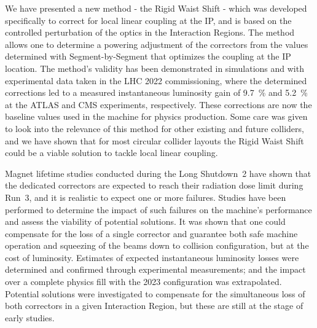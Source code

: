 We have presented a new method - the Rigid Waist Shift - which was developed specifically to correct for local linear coupling at the IP, and is based on the controlled perturbation of the optics in the Interaction Regions.
The method allows one to determine a powering adjustment of the correctors from the values determined with Segment-by-Segment that optimizes the coupling at the IP location.
The method's validity has been demonstrated in simulations and with experimental data taken in the LHC \num{2022} commissioning, where the determined corrections led to a measured instantaneous luminosity gain of \qty{9.7}{\percent} and \qty{5.2}{\percent} at the ATLAS and CMS experiments, respectively.
These corrections are now the baseline values used in the machine for physics production.
Some care was given to look into the relevance of this method for other existing and future colliders, and we have shown that for most circular collider layouts the Rigid Waist Shift could be a viable solution to tackle local linear coupling.
\newline

Magnet lifetime studies conducted during the Long Shutdown~\num{2} have shown that the dedicated correctors are expected to reach their radiation dose limit during Run~\num{3}, and it is realistic to expect one or more failures.
Studies have been performed to determine the impact of such failures on the machine's performance and assess the viability of potential solutions.
It was shown that one could compensate for the loss of a single corrector and guarantee both safe machine operation and squeezing of the beams down to collision configuration, but at the cost of luminosity.
Estimates of expected instantaneous luminosity losses were determined and confirmed through experimental measurements; and the impact over a complete physics fill with the \num{2023} configuration was extrapolated.
Potential solutions were investigated to compensate for the simultaneous loss of both correctors in a given Interaction Region, but these are still at the stage of early studies.

\glsresetall                                     %
